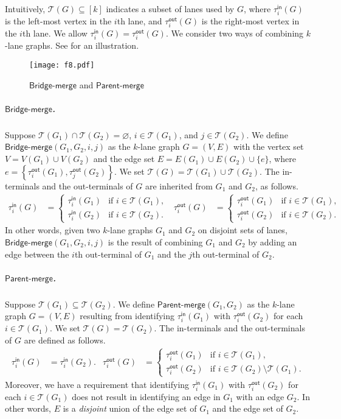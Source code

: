 \documentclass[11pt]{article}
\theoremstyle{definition}
\theoremstyle{remark}
\renewcommand{\emptyset}{\varnothing}
\newcommand{\tin}{\tau^{\mathsf{in}}}
\newcommand{\tout}{\tau^{\mathsf{out}}}
\newcommand{\pmerge}{\mathsf{Parent}\text{-}\mathsf{merge}}
\newcommand{\bmerge}{\mathsf{Bridge}\text{-}\mathsf{merge}}
\begin{document}
Intuitively, $\mathcal{T}(G) \subseteq [k]$ indicates a subset of lanes used by $G$, where $\tin_i(G)$ is the left-most vertex in the $i$th lane, and $\tout_i(G)$ is the right-most vertex in the $i$th lane. We allow $\tin_i(G)=\tout_i(G)$.
We consider two ways of combining $k$-lane graphs. See  for an illustration.

\begin{figure}[ht!]
    \centering
    \texttt{[image: f8.pdf]}
    \caption{$\bmerge$ and $\pmerge$}
    \label{fig:f8}
\end{figure}

\subparagraph{$\bmerge$.} Suppose $\mathcal{T}(G_1) \cap\mathcal{T}(G_2) = \emptyset$, $i \in \mathcal{T}(G_1)$, and $j \in \mathcal{T}(G_2)$. We define $\bmerge(G_1,G_2,i,j)$ as the $k$-lane graph $G=(V,E)$ with the vertex set $V= V(G_1) \cup V(G_2)$ and the edge set $E = E(G_1) \cup E(G_2) \cup \{e\}$, where $e=\left\{\tout_i(G_1), \tout_j(G_2)\right\}$. We set $\mathcal{T}(G) = \mathcal{T}(G_1) \cup \mathcal{T}(G_2)$. The in-terminals and the out-terminals of $G$ are inherited from $G_1$ and $G_2$, as follows.
\begin{align*}
\tin_i(G) &=\begin{cases}
        \tin_i(G_1) & \text{if $i \in \mathcal{T}(G_1)$,} \\
        \tin_i(G_2) & \text{if $i \in \mathcal{T}(G_2)$.}
    \end{cases} &
    \tout_i(G)&=\begin{cases}
        \tout_i(G_1) & \text{if $i \in \mathcal{T}(G_1)$,} \\
        \tout_i(G_2) & \text{if $i \in \mathcal{T}(G_2)$.}
    \end{cases}
\end{align*}
In other words, given two $k$-lane graphs $G_1$ and $G_2$ on disjoint sets of lanes, $\bmerge(G_1,G_2,i,j)$ is the result of combining $G_1$ and $G_2$ by adding an edge between the $i$th out-terminal of $G_1$ and the $j$th out-terminal of $G_2$.

\subparagraph{$\pmerge$.} Suppose $\mathcal{T}(G_1) \subseteq \mathcal{T}(G_2)$. We define $\pmerge(G_1,G_2)$ as the $k$-lane graph $G=(V,E)$ resulting from identifying $\tin_i(G_1)$ with $\tout_i(G_2)$ for each $i \in \mathcal{T}(G_1)$. We set $\mathcal{T}(G) = \mathcal{T}(G_2)$. The in-terminals and the out-terminals of $G$ are defined as follows.
\begin{align*}
\tin_i(G) &= \tin_i(G_2). &
    \tout_i(G)&=\begin{cases}
        \tout_i(G_1) & \text{if $i \in \mathcal{T}(G_1)$,} \\
        \tout_i(G_2) & \text{if $i \in \mathcal{T}(G_2) \setminus \mathcal{T}(G_1)$.}
    \end{cases}
\end{align*}
Moreover, we have a requirement that identifying $\tin_i(G_1)$ with $\tout_i(G_2)$ for each $i \in \mathcal{T}(G_1)$ does not result in identifying an edge in $G_1$ with an edge $G_2$. In other words, $E$ is a \emph{disjoint} union of the edge set of $G_1$ and the edge set of $G_2$. 
\end{document}
